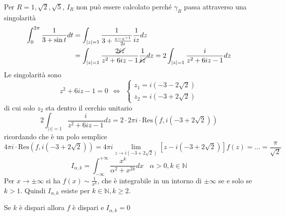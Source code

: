 Per $R=1,\sqrt{2} ,\sqrt{5}$, $I_{R}$ non può essere calcolato perché $\gamma _{R}$ passa attraverso una singolarità
\Soluzione
\begin{align*}
\int ^{2\pi }_{0}\frac{1}{3+\sin t} dt & =\int _{\left| z\right| =1}\frac{1}{3+\frac{z-z^{-1}}{2i}}\frac{1}{iz} dz\\
 & =\int _{\left| z\right| =1}\frac{2\cancel{iz}}{z^{2} +6iz-1}\frac{1}{\cancel{iz}} dz=2\int _{\left| z\right| =1}\frac{i}{z^{2} +6iz-1} dz
\end{align*}
Le singolarità sono
\begin{equation*}
z^{2} +6iz-1=0\ \ \iff \ \ \begin{cases}
z_{1} =i\left( -3-2\sqrt{2}\right)\\
z_{2} =i\left( -3+2\sqrt{2}\right)
\end{cases}
\end{equation*}
di cui solo $z_{2}$ sta dentro il cerchio unitario
\begin{equation*}
2\int _{\left| z\right| =1}\frac{i}{z^{2} +6iz-1} dz=2\cdotp 2\pi i\cdotp \mathrm{Res}\left( f,i\left( -3+2\sqrt{2}\right)\right)
\end{equation*}
ricordando che è un polo semplice
\begin{equation*}
4\pi i\cdotp \mathrm{Res}\left( f,i\left( -3+2\sqrt{2}\right)\right) =4\pi i\lim\limits _{z\rightarrow i\left( -3+2\sqrt{2}\right)}\left[ z-i\left( -3+2\sqrt{2}\right)\right] f\left( z\right) =\dotsc =\frac{\pi }{\sqrt{2}}
\end{equation*}
\Soluzione
\begin{equation*}
I_{\alpha ,k} =\int ^{+\infty }_{-\infty }\frac{x^{k}}{\alpha ^{2} +x^{2k}} dx\ \ \ \ \alpha  >0,k\in \mathbb{N}
\end{equation*}
Per $x\rightarrow \pm \infty $ si ha $f\left( x\right) \sim \frac{1}{x^{k}}$, che è integrabile in un intorno di $\pm \infty $ se e solo se $k >1$. Quindi $I_{\alpha ,k}$ esiste per $k\in \mathbb{N} ,k\geqslant 2$.

Se $k$ è dispari allora $f$ è dispari e $I_{\alpha ,k} =0$

